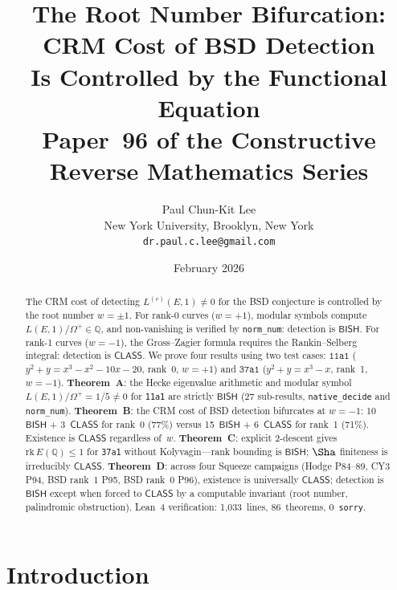 \documentclass[11pt]{article}
\theoremstyle{plain}
\theoremstyle{definition}
\theoremstyle{remark}
\newcommand{\Q}{\mathbb{Q}}
\newcommand{\rk}{\mathrm{rk}}
\newcommand{\BISH}{\ensuremath{\mathsf{BISH}}}
\newcommand{\CLASS}{\ensuremath{\mathsf{CLASS}}}
\begin{document}
\title{The Root Number Bifurcation: CRM Cost of BSD Detection\\
Is Controlled by the Functional Equation\\[6pt]
\large Paper~96 of the Constructive Reverse Mathematics Series}

\author{Paul Chun-Kit Lee\\
\small New York University, Brooklyn, New York\\
\small \texttt{dr.paul.c.lee@gmail.com}}

\date{February 2026}

\maketitle

\begin{abstract}
The CRM cost of detecting $L^{(r)}(E,1) \neq 0$ for the BSD conjecture is controlled by the root number $w = \pm 1$. For rank-0 curves ($w = +1$), modular symbols compute $L(E,1)/\Omega^+ \in \Q$, and non-vanishing is verified by \texttt{norm\_num}: detection is $\BISH$. For rank-1 curves ($w = -1$), the Gross--Zagier formula requires the Rankin--Selberg integral: detection is $\CLASS$. We prove four results using two test cases: $\texttt{11a1}$ ($y^2 + y = x^3 - x^2 - 10x - 20$, rank~0, $w = +1$) and $\texttt{37a1}$ ($y^2 + y = x^3 - x$, rank~1, $w = -1$). \textbf{Theorem~A}: the Hecke eigenvalue arithmetic and modular symbol $L(E,1)/\Omega^+ = 1/5 \neq 0$ for \texttt{11a1} are strictly $\BISH$ (27 sub-results, \texttt{native\_decide} and \texttt{norm\_num}). \textbf{Theorem~B}: the CRM cost of BSD detection bifurcates at $w = -1$: 10~$\BISH$ + 3~$\CLASS$ for rank~0 (77\%) versus 15~$\BISH$ + 6~$\CLASS$ for rank~1 (71\%). Existence is $\CLASS$ regardless of~$w$. \textbf{Theorem~C}: explicit 2-descent gives $\rk\, E(\Q) \leq 1$ for \texttt{37a1} without Kolyvagin---rank bounding is $\BISH$; $\Sha$ finiteness is irreducibly $\CLASS$. \textbf{Theorem~D}: across four Squeeze campaigns (Hodge P84--89, CY3 P94, BSD rank~1 P95, BSD rank~0 P96), existence is universally $\CLASS$; detection is $\BISH$ except when forced to $\CLASS$ by a computable invariant (root number, palindromic obstruction). Lean~4 verification: 1{,}033~lines, 86~theorems, 0~\texttt{sorry}.
\end{abstract}

\section{Introduction}
\label{sec:intro}
\end{document}
